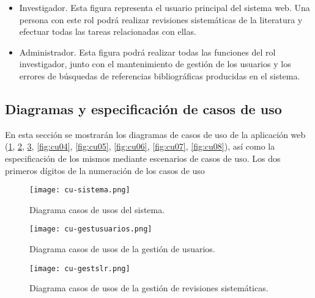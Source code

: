 \begin{itemize}
	\item Investigador. Esta figura representa el usuario principal del sistema web. Una persona con este rol podrá realizar revisiones sistemáticas de la literatura y efectuar todas las tareas relacionadas con ellas.
	\item Administrador. Esta figura podrá realizar todas las funciones del rol investigador, junto con el mantenimiento de gestión de los usuarios y los errores de búsquedas de referencias bibliográficas producidas en el sistema.
\end{itemize}


\subsection{Diagramas y especificación de casos de uso}
En esta sección se mostrarán los diagramas de casos de uso de la aplicación web (\ref{fig:cu01}, \ref{fig:cu02}, \ref{fig:cu03}, \ref{fig:cu04}, \ref{fig:cu05}, \ref{fig:cu06}, \ref{fig:cu07}, \ref{fig:cu08}), así como la especificación de los mismos mediante escenarios de casos de uso. Los dos primeros dígitos de la numeración de los casos de uso 

\begin{figure}[h!]
	\begin{center} 
		\texttt{[image: cu-sistema.png]}
		\caption{Diagrama casos de usos del sistema.}
		\label{fig:cu01}
	\end{center}
\end{figure}

\begin{figure}[h!]
	\begin{center} 
		\texttt{[image: cu-gestusuarios.png]}
		\caption{Diagrama casos de usos de la gestión de usuarios.}
		\label{fig:cu02}
	\end{center}
\end{figure}

\begin{figure}[h!]
	\begin{center}
		\texttt{[image: cu-gestslr.png]}
		\caption{Diagrama casos de usos de la gestión de revisiones sistemáticas.}
		\label{fig:cu03}
	\end{center}
\end{figure}

